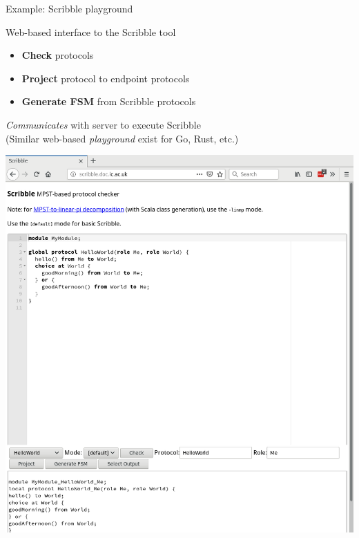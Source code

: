 \documentclass[aspectratio=1610]{beamer}
\begin{document}
\begin{frame}{Example: Scribble playground}{}
  \begin{minipage}{0.55\linewidth}
    Web-based interface to the Scribble tool
    \begin{itemize}
      \item \textbf{Check} protocols
      \item \textbf{Project} protocol to endpoint protocols
      \item \textbf{Generate FSM} from Scribble protocols
    \end{itemize}
    \vspace{3ex}
    \textit{Communicates} with server to execute Scribble
    \\[3ex]
    {\footnotesize (Similar web-based \textit{playground} exist for Go, Rust, etc.)}
  \end{minipage}
  \begin{minipage}{0.43\linewidth}
    \quad
    \includegraphics[width=\linewidth]{scribble-playground}
  \end{minipage}
\end{frame}
\end{document}
